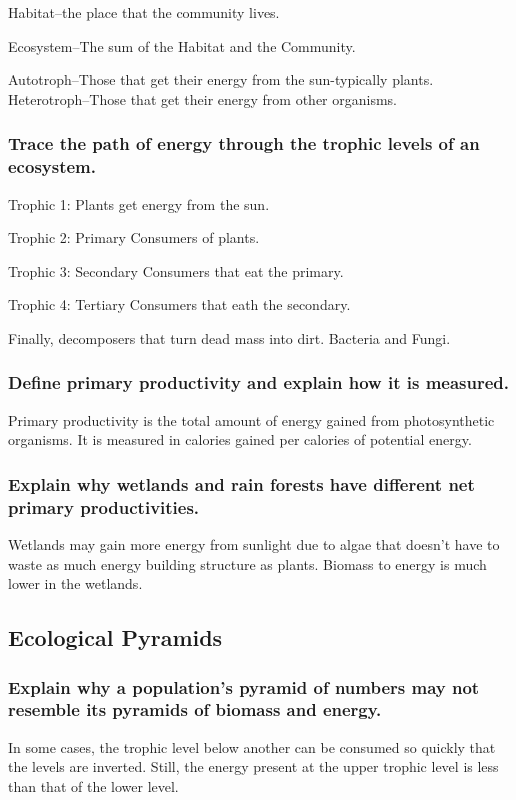 \documentclass[a4paper]{article}
\begin{document}
Habitat--the place that the community lives.

Ecosystem--The sum of the Habitat and the Community.

Autotroph--Those that get their energy from the sun-typically plants.
Heterotroph--Those that get their energy from other organisms.

\subsubsection{Trace the path of energy through the trophic levels of an ecosystem.}
Trophic 1: Plants get energy from the sun.

Trophic 2: Primary Consumers of plants.

Trophic 3: Secondary Consumers that eat the primary.

Trophic 4: Tertiary Consumers that eath the secondary.

Finally, decomposers that turn dead mass into dirt. Bacteria and Fungi.

\subsubsection{Define primary productivity and explain how it is measured.}
Primary productivity is the total amount of energy gained from photosynthetic organisms. It is measured in calories gained per
calories of potential energy.

\subsubsection{Explain why wetlands and rain forests have different net primary productivities.}
Wetlands may gain more energy from sunlight due to algae that doesn't have to waste as much energy building structure as plants.
Biomass to energy is much lower in the wetlands.

\subsection{Ecological Pyramids}
\subsubsection{Explain why a population's pyramid of numbers may not resemble its pyramids of biomass and energy.}
In some cases, the trophic level below another can be consumed so quickly that the levels are inverted. Still, the energy present
at the upper trophic level is less than that of the lower level.
\end{document}
